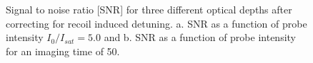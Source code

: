 \documentclass[12pt]{iopart}
\begin{document}
\begin{figure}
\caption{Signal to noise ratio [SNR] for three different optical depths after correcting for recoil induced detuning. a. SNR as a function of probe intensity $I_0/I_{sat}=5.0$ and b. SNR as a function of probe intensity for an imaging time of 50\us{}.}  
\label{fig:SNR}
\end{figure}
\end{document}
